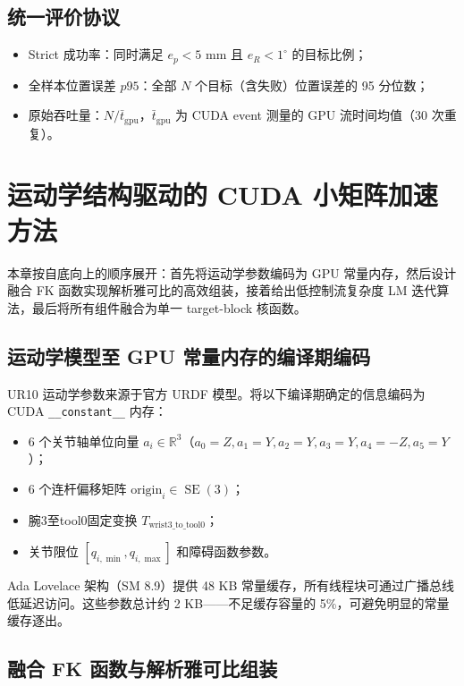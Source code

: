 \documentclass[twocolumn,a4paper,10pt]{ctexart}
\DeclareMathOperator{\SE}{SE}
\newcommand{\R}{\mathbb{R}}
\begin{document}
\subsection{统一评价协议}

\begin{itemize}
  \item Strict 成功率：同时满足 $e_p<5$ mm 且 $e_R<1^\circ$ 的目标比例；
  \item 全样本位置误差 $p95$：全部 $N$ 个目标（含失败）位置误差的 95 分位数；
  \item 原始吞吐量：$N/\bar{t}_{\mathrm{gpu}}$，$\bar{t}_{\mathrm{gpu}}$ 为 CUDA event 测量的 GPU 流时间均值（30 次重复）。
\end{itemize}

\section{运动学结构驱动的 CUDA 小矩阵加速方法}

本章按自底向上的顺序展开：首先将运动学参数编码为 GPU 常量内存，然后设计融合 FK 函数实现解析雅可比的高效组装，接着给出低控制流复杂度 LM 迭代算法，最后将所有组件融合为单一 target-block 核函数。

\subsection{运动学模型至 GPU 常量内存的编译期编码}

UR10 运动学参数来源于官方 URDF 模型\cite{urdf}。将以下编译期确定的信息编码为 CUDA \texttt{\_\_constant\_\_} 内存：

\begin{itemize}
  \item 6 个关节轴单位向量 $a_i\in\R^3$（$a_0=Z,a_1=Y,a_2=Y,a_3=Y,a_4=-Z,a_5=Y$）；
  \item 6 个连杆偏移矩阵 $\mathrm{origin}_i\in\SE(3)$；
  \item 腕3至tool0固定变换 $T_{\mathrm{wrist3\_to\_tool0}}$；
  \item 关节限位 $[q_{i,\min},q_{i,\max}]$ 和障碍函数参数。
\end{itemize}

Ada Lovelace 架构（SM 8.9）提供 48 KB 常量缓存，所有线程块可通过广播总线低延迟访问。这些参数总计约 2 KB——不足缓存容量的 5\%，可避免明显的常量缓存逐出。

\subsection{融合 FK 函数与解析雅可比组装}
\end{document}
